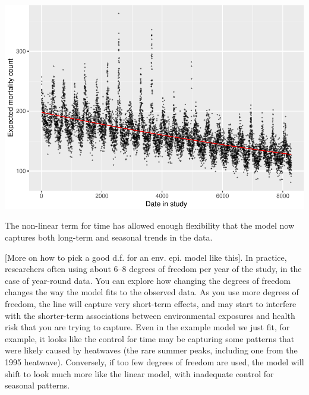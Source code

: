 \documentclass[
]{book}
\newenvironment{Shaded}{\begin{snugshade}}{\end{snugshade}}
\newcommand{\AttributeTok}[1]{\textcolor[rgb]{0.77,0.63,0.00}{#1}}
\newcommand{\FloatTok}[1]{\textcolor[rgb]{0.00,0.00,0.81}{#1}}
\newcommand{\FunctionTok}[1]{\textcolor[rgb]{0.00,0.00,0.00}{#1}}
\newcommand{\NormalTok}[1]{#1}
\newcommand{\SpecialCharTok}[1]{\textcolor[rgb]{0.00,0.00,0.00}{#1}}
\newcommand{\StringTok}[1]{\textcolor[rgb]{0.31,0.60,0.02}{#1}}
\begin{document}
\begin{Shaded}
\end{Shaded}

\includegraphics{adv_epi_analysis_files/figure-latex/unnamed-chunk-49-1.pdf}

The non-linear term for time has allowed enough flexibility that the model now
captures both long-term and seasonal trends in the data.

{[}More on how to pick a good d.f. for an env. epi. model like this{]}. In practice,
researchers often using about 6--8 degrees of freedom per year of the study, in
the case of year-round data. You can explore how changing the degrees of freedom
changes the way the model fits to the observed data. As you use more degrees of
freedom, the line will capture very short-term effects, and may start to
interfere with the shorter-term associations between environmental exposures and
health risk that you are trying to capture. Even in the example model we just
fit, for example, it looks like the control for time may be capturing some
patterns that were likely caused by heatwaves (the rare summer peaks, including
one from the 1995 heatwave). Conversely, if too few degrees of freedom are used,
the model will shift to look much more like the linear model, with inadequate
control for seasonal patterns.
\end{document}
